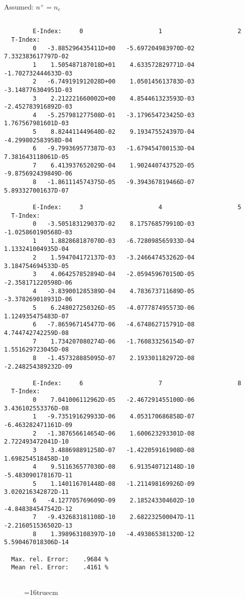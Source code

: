 \documentclass[12pt,dvipdfmx]{article}
\begin{document}
Assumed:  $n^+ = n_e$
\begin{small}\begin{verbatim}

        E-Index:     0                     1                     2
  T-Index:
        0   -3.885296435411D+00   -5.697204983970D-02    7.332383617797D-02
        1    1.505487187018D+01    4.633572829771D-04   -1.702732444633D-03
        2   -6.749191912028D+00    1.050145613783D-03   -3.148776304951D-03
        3    2.212221660002D+00    4.854461323593D-03   -2.452783916892D-03
        4   -5.257981277508D-01   -3.179654723425D-03    1.767567981601D-03
        5    8.824411449640D-02    9.193475524397D-04   -4.299802583958D-04
        6   -9.799369577387D-03   -1.679454700153D-04    7.381643118061D-05
        7    6.413937652029D-04    1.902440743752D-05   -9.875692439849D-06
        8   -1.861114574375D-05   -9.394367819466D-07    5.893327001637D-07

        E-Index:     3                     4                     5
  T-Index:
        0   -3.505183129037D-02    8.175768579910D-03   -1.025860190568D-03
        1    1.882868187070D-03   -6.728098565933D-04    1.133241004935D-04
        2    1.594704172137D-03   -3.246647453262D-04    3.184754694533D-05
        3    4.064257852894D-04   -2.059459670150D-05   -2.358171220598D-06
        4   -3.839001285389D-04    4.783673711689D-05   -3.378269018931D-06
        5    6.248027250326D-05   -4.077787495573D-06    1.124935475483D-07
        6   -7.865967145477D-06   -4.674862715791D-08    4.744742742259D-08
        7    1.734207080274D-06   -1.760833256154D-07    1.551629723045D-08
        8   -1.457328885095D-07    2.193301182972D-08   -2.248254389232D-09

        E-Index:     6                     7                     8
  T-Index:
        0    7.041006112962D-05   -2.467291455100D-06    3.436102553376D-08
        1   -9.735191629933D-06    4.053170686858D-07   -6.463282471161D-09
        2   -1.387656614654D-06    1.600623293301D-08    2.722493472041D-10
        3    3.488698891258D-07   -1.422059161908D-08    1.698254518458D-10
        4    9.511636577030D-08    6.913540712148D-10   -5.483090178167D-11
        5    1.140116701448D-08   -1.211498169926D-09    3.020216342872D-11
        6   -4.127705769609D-09    2.185243304602D-10   -4.848384547542D-12
        7   -9.432683181108D-10    2.682232500047D-11   -2.216051536502D-13
        8    1.398963108397D-10   -4.493865381320D-12    5.590467018306D-14

  Max. rel. Error:    .9684 %
  Mean rel. Error:    .4161 %


\end{verbatim}\end{small}
\begin{figure} \label{2.1.5_equil}
\epsfxsize=16truecm
\end{figure}
\newpage
\end{document}
